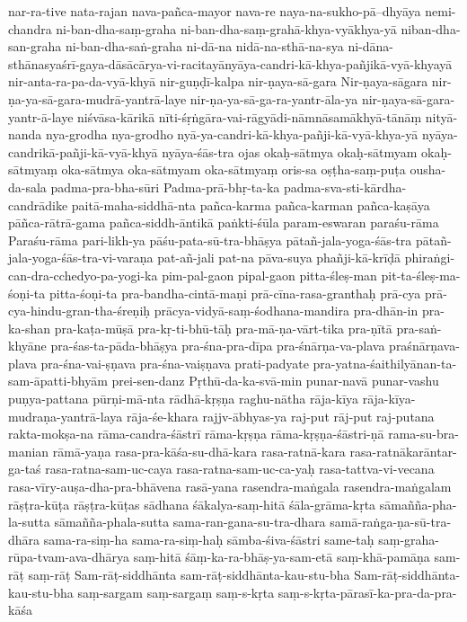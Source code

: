 {nar-ra-tive
nata-rajan
nava-pañca-mayor
nava-re
naya-na-sukho-pā--dhyāya
nemi-chandra
ni-ban-dha-saṃ-graha
ni-ban-dha-saṃ-grahā-khya-vyākhya-yā
niban-dha-san-graha
ni-ban-dha-saṅ-graha
ni-dā-na
nidā-na-sthā-na-sya
ni-dāna-sthānasyaśrī-gaya-dāsācārya-vi-racitayānyāya-candri-kā-khya-pañjikā-vyā-khyayā
nir-anta-ra-pa-da-vyā-khyā
nir-guṇḍī-kalpa
nir-ṇaya-sā-gara
Nir-ṇaya-sāgara
nir-ṇa-ya-sā-gara-mudrā-yantrā-laye
nir-ṇa-ya-sā-ga-ra-yantr-āla-ya
nir-ṇaya-sā-gara-yantr-ā-laye
niśvāsa-kārikā
nīti-śṛṅgāra-vai-rāgyādi-nāmnāsamākhyā-tānāṃ
nityā-nanda
nya-grodha
nya-grodho
nyā-ya-candri-kā-khya-pañji-kā-vyā-khya-yā
nyāya-candrikā-pañji-kā-vyā-khyā
nyāya-śās-tra
ojas
okaḥ-sātmya
okaḥ-sātmyam
okaḥ-sātmyaṃ
oka-sātmya
oka-sātmyam
oka-sātmyaṃ
oris-sa
oṣṭha-saṃ-puṭa
ousha-da-sala
padma-pra-bha-sūri
Padma-prā-bhṛ-ta-ka
padma-sva-sti-kārdha-candrādike
paitā-maha-siddhā-nta
pañca-karma
pañca-karman
pañca-kaṣāya
pāñca-rātrā-gama
pañca-siddh-āntikā
paṅkti-śūla
param-eswaran
paraśu-rāma
Paraśu-rāma
pari-likh-ya
pāśu-pata-sū-tra-bhāṣya
pātañ-jala-yoga-śās-tra
pātañ-jala-yoga-śās-tra-vi-varaṇa
pat-añ-jali
pat-na
pāva-suya
phañji-kā-krīḍā
phiraṅgi-can-dra-cchedyo-pa-yogi-ka
pim-pal-gaon
pipal-gaon
pitta-śleṣ-man
pit-ta-śleṣ-ma-śoṇi-ta
pitta-śoṇi-ta
pra-bandha-cintā-maṇi
prā-cīna-rasa-granthaḥ
prā-cya
prā-cya-hindu-gran-tha-śreṇiḥ
prācya-vidyā-saṃ-śodhana-mandira
pra-dhān-in
pra-ka-shan
pra-kaṭa-mūṣā
pra-kṛ-ti-bhū-tāḥ
pra-mā-ṇa-vārt-tika
pra-ṇītā
pra-saṅ-khyāne
pra-śas-ta-pāda-bhāṣya
pra-śna-pra-dīpa
pra-śnārṇa-va-plava
praśnārṇava-plava
pra-śna-vai-ṣṇava
pra-śna-vaiṣṇava
prati-padyate
pra-yatna-śaithilyānan-ta-sam-āpatti-bhyām
prei-sen-danz
Pṛthū-da-ka-svā-min
punar-navā
punar-vashu
puṇya-pattana
pūrṇi-mā-nta
rādhā-kṛṣṇa
raghu-nātha
rāja-kīya
rāja-kīya-mudraṇa-yantrā-laya
rāja-śe-khara
rajjv-ābhyas-ya
raj-put
rāj-put
raj-putana
rakta-mokṣa-na
rāma-candra-śāstrī
rāma-kṛṣṇa
rāma-kṛṣṇa-śāstri-ṇā
rama-su-bra-manian
rāmā-yaṇa
rasa-pra-kāśa-su-dhā-kara
rasa-ratnā-kara
rasa-ratnākarāntar-ga-taś
rasa-ratna-sam-uc-caya
rasa-ratna-sam-uc-ca-yaḥ
rasa-tattva-vi-vecana
rasa-vīry-auṣa-dha-pra-bhāvena
rasā-yana
rasendra-maṅgala
rasendra-maṅgalam
rāṣṭra-kūṭa
rāṣṭra-kūṭas
sādhana
śākalya-saṃ-hitā
śāla-grāma-kṛta
sāmañña-pha-la-sutta
sāmañña-phala-sutta
sama-ran-gana-su-tra-dhara
samā-raṅga-ṇa-sū-tra-dhāra
sama-ra-siṃ-ha
sama-ra-siṃ-haḥ
sāmba-śiva-śāstri
same-taḥ
saṃ-graha-rūpa-tvam-ava-dhārya
saṃ-hitā
śāṃ-ka-ra-bhāṣ-ya-sam-etā
saṃ-khā-pamāṇa
sam-rāṭ
saṃ-rāṭ
Sam-rāṭ-siddhānta
sam-rāṭ-siddhānta-kau-stu-bha
Sam-rāṭ-siddhānta-kau-stu-bha
saṃ-sargam
saṃ-sargaṃ
saṃ-s-kṛta
saṃ-s-kṛta-pārasī-ka-pra-da-pra-kāśa
}
